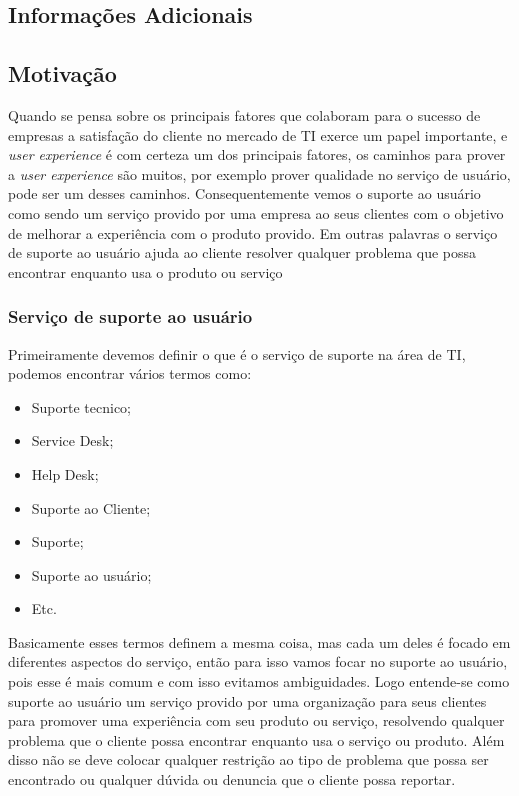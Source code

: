 \documentclass[11pt,a4paper]{article}
\begin{document}
\tableofcontents
\listoffigures
\listoftables

\begin{flushleft}
\section{Informações Adicionais}

\subsection{Motivação}
Quando se pensa sobre os principais fatores que colaboram para o sucesso de
empresas a  satisfação do cliente no mercado de TI exerce um papel importante,
e \textit{user experience} é com certeza um dos principais fatores, os caminhos
para prover a \textit{user experience} são muitos, por exemplo prover qualidade
no serviço de usuário, pode ser um desses caminhos. Consequentemente vemos o
suporte ao usuário como sendo um serviço provido por uma empresa  ao seus
clientes com o objetivo de melhorar a experiência com o produto provido. Em
outras palavras o serviço de suporte ao usuário ajuda ao cliente resolver
qualquer problema que possa encontrar enquanto usa o produto ou serviço

\end{flushleft}

\subsubsection{Serviço de suporte ao usuário}
Primeiramente devemos definir o que é o serviço de suporte na área de TI,
podemos encontrar vários termos como:
\begin{itemize}[noitemsep]
  \item Suporte tecnico;
  \item Service Desk;
  \item Help Desk;
  \item Suporte ao Cliente;
  \item Suporte;
  \item Suporte ao usuário;
  \item Etc.
\end{itemize}

Basicamente esses termos definem a mesma coisa, mas cada um deles é focado
em diferentes aspectos do serviço, então para isso vamos focar no suporte
ao usuário, pois esse é mais comum e com isso evitamos ambiguidades.
Logo entende-se como suporte ao usuário um serviço provido por uma organização
para seus clientes para promover uma experiência com seu produto ou serviço,
resolvendo qualquer problema que o cliente possa encontrar enquanto usa o
serviço ou produto. Além disso não se  deve colocar qualquer restrição ao tipo
de problema que possa ser encontrado ou qualquer dúvida ou denuncia que o
cliente possa reportar.
\end{document}
